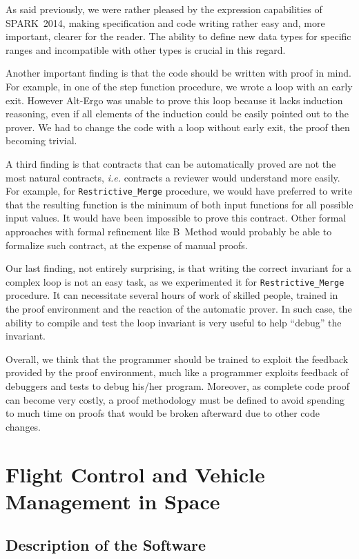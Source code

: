 \documentclass[10pt,a4paper,twocolumn]{article}
\newcommand{\newspark}{SPARK~2014\xspace}
\newcommand{\altergo}{Alt-Ergo\xspace}
\newcommand{\ie}{\textit{i.e.}\xspace}
\newcommand{\SPARK}[1]{\lstinline[language=Ada,basicstyle={\footnotesize
      \sffamily},framesep=0pt]$#1$}
\begin{document}
As said previously, we were rather pleased by the expression
capabilities of \newspark, making specification and code writing
rather easy and, more important, clearer for the reader. The ability
to define new data types for specific ranges and incompatible with
other types is crucial in this regard.

Another important finding is that the code should be written with
proof in mind. For example, in one of the step function procedure, we
wrote a loop with an early exit. However \altergo was unable to prove
this loop because it lacks induction reasoning, even if all elements
of the induction could be easily pointed out to the prover. We had to
change the code with a loop without early exit, the proof then
becoming trivial.

A third finding is that contracts that can be automatically proved are
not the most natural contracts, \ie contracts a reviewer would
understand more easily. For example, for \SPARK{Restrictive_Merge}
procedure, we would have preferred to write that the resulting function
is the minimum of both input functions for all possible input
values. It would have been impossible to prove this contract. Other
formal approaches with formal refinement like B~Method would probably
be able to formalize such contract, at the expense of manual proofs.

Our last finding, not entirely surprising, is that writing the correct
invariant for a complex loop is not an easy task, as we experimented
it for \SPARK{Restrictive_Merge} procedure. It can necessitate several
hours of work of skilled people, trained in the proof environment and
the reaction of the automatic prover. In such case, the ability to
compile and test the loop invariant is very useful to help ``debug''
the invariant.

Overall, we think that the programmer should be trained to exploit the
feedback provided by the proof environment, much like a programmer
exploits feedback of debuggers and tests to debug his/her program.
Moreover, as complete code proof can become very costly, a proof
methodology must be defined to avoid spending to much time on proofs
that would be broken afterward due to other code changes.


\section{Flight Control and Vehicle Management in Space}

\subsection{Description of the Software}
\end{document}
